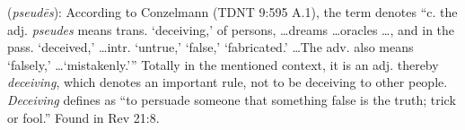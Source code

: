 \item[Deceiving,]

(\textit{pseudēs}):
According to Conzelmann (TDNT 9:595 A.1), the term denotes ``c. the adj. \emph{pseudes} means trans. `deceiving,' of persons, \ldots dreams \ldots oracles \ldots, and in the pass. `deceived,' \ldots intr. `untrue,' `false,' `fabricated.' \ldots The adv. also means `falsely,' \ldots `mistakenly.''' Totally in the mentioned context, it is an adj. thereby \emph{deceiving}, which denotes an important rule, not to be deceiving to other people. \emph{Deceiving} defines as ``to persuade someone that something false is the truth; trick or fool.''
Found in Rev 21:8.
